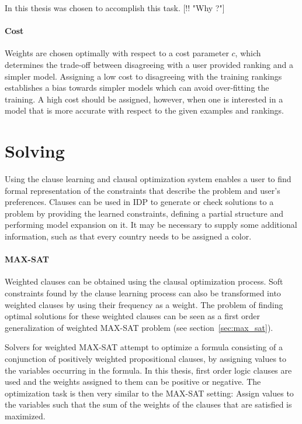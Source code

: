 In this thesis \svm{} was chosen to accomplish this task.
[!! "Why \svm{}?"]

\paragraph{Cost}
Weights are chosen optimally with respect to a cost parameter $c$, which determines the trade-off between disagreeing with a user provided ranking and a simpler model.
Assigning a low cost to disagreeing with the training rankings establishes a bias towards simpler models which can avoid over-fitting the training.
A high cost should be assigned, however, when one is interested in a model that is more accurate with respect to the given examples and rankings.

\section{Solving}
Using the clause learning and clausal optimization system enables a user to find formal representation of the constraints that describe the problem and user's preferences.
Clauses can be used in IDP to generate or check solutions to a problem by providing the learned constraints, defining a partial structure and performing model expansion on it.
It may be necessary to supply some additional information, such as that every country needs to be assigned a color.

\paragraph{MAX-SAT}
Weighted clauses can be obtained using the clausal optimization process.
Soft constraints found by the clause learning process can also be transformed into weighted clauses by using their frequency as a weight.
The problem of finding optimal solutions for these weighted clauses can be seen as a first order generalization of weighted MAX-SAT problem (see section~\ref{sec:max_sat}).

Solvers for weighted MAX-SAT attempt to optimize a formula consisting of a conjunction of positively weighted propositional clauses, by assigning values to the variables occurring in the formula.
In this thesis, first order logic clauses are used and the weights assigned to them can be positive or negative.
The optimization task is then very similar to the MAX-SAT setting:
Assign values to the variables such that the sum of the weights of the clauses that are satisfied is maximized.

